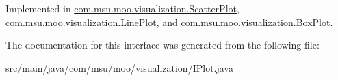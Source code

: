 Implemented in \hyperlink{classcom_1_1msu_1_1moo_1_1visualization_1_1ScatterPlot_a1c5117bd94b91e9ae2f59c1c025b243b}{com.\-msu.\-moo.\-visualization.\-Scatter\-Plot}, \hyperlink{classcom_1_1msu_1_1moo_1_1visualization_1_1LinePlot_ab6bc90e83277d08e59c3efd82e3b585d}{com.\-msu.\-moo.\-visualization.\-Line\-Plot}, and \hyperlink{classcom_1_1msu_1_1moo_1_1visualization_1_1BoxPlot_acfbffc8df459e92c6b39108371fd462c}{com.\-msu.\-moo.\-visualization.\-Box\-Plot}.



The documentation for this interface was generated from the following file\-:\begin{DoxyCompactItemize}
\item 
src/main/java/com/msu/moo/visualization/I\-Plot.\-java\end{DoxyCompactItemize}

